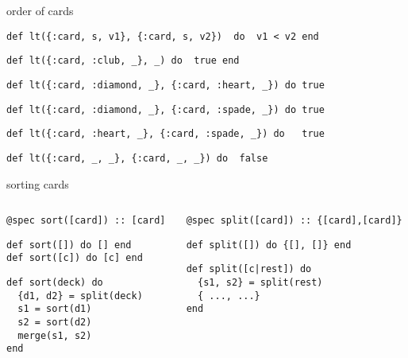 \begin{frame}[fragile]{order of cards}

\pause
\begin{verbatim}
def lt({:card, s, v1}, {:card, s, v2})  do  v1 < v2 end
\end{verbatim}
\pause
\begin{verbatim}
def lt({:card, :club, _}, _) do  true end
\end{verbatim}
\pause
\begin{verbatim}
def lt({:card, :diamond, _}, {:card, :heart, _}) do true
\end{verbatim}
\pause
\begin{verbatim}
def lt({:card, :diamond, _}, {:card, :spade, _}) do true
\end{verbatim}
\pause
\begin{verbatim}
def lt({:card, :heart, _}, {:card, :spade, _}) do   true
\end{verbatim}
\pause
\begin{verbatim}
def lt({:card, _, _}, {:card, _, _}) do  false
\end{verbatim}

\end{frame}

\begin{frame}[fragile]{sorting cards}

\begin{columns}

 \begin{column}{0.4\linewidth}
\begin{verbatim}
@spec sort([card]) :: [card]
\end{verbatim}
\begin{verbatim}
def sort([]) do [] end
def sort([c]) do [c] end
\end{verbatim}
\pause
\begin{verbatim}
def sort(deck) do
  {d1, d2} = split(deck)
  s1 = sort(d1)
  s2 = sort(d2)
  merge(s1, s2)
end
\end{verbatim}
 \end{column}
 
 \pause

 \begin{column}{0.5\linewidth}
\begin{verbatim}
@spec split([card]) :: {[card],[card]}
\end{verbatim}
\pause
\begin{verbatim}
def split([]) do {[], []} end
\end{verbatim}
\begin{verbatim}
def split([c|rest]) do 
  {s1, s2} = split(rest)
  { ..., ...}
end
\end{verbatim}
 \end{column}
\end{columns}

\end{frame}

